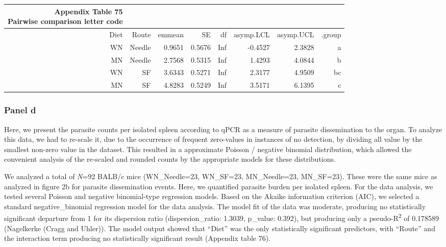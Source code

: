 \documentclass[
  12pt,
  letterpaper,
]{article}
\begin{document}
\begingroup
\fontsize{12.0pt}{14.4pt}\selectfont
\begin{longtable}{rrrrrrrr}
\caption*{
{\large \textbf{Appendix Table 75}} \\ 
{\small \textbf{Pairwise comparison letter code}}
} \\ 
\toprule
{Diet} & {Route} & {emmean} & {SE} & {df} & {asymp.LCL} & {asymp.UCL} & {.group} \\ 
\midrule\addlinespace[2.5pt]
WN & Needle & 0.9651 & 0.5676 & Inf & -0.4527 & 2.3828 &  a   \\ 
MN & Needle & 2.7568 & 0.5315 & Inf & 1.4293 & 4.0844 &   b  \\ 
WN & SF & 3.6343 & 0.5271 & Inf & 2.3177 & 4.9509 &   bc \\ 
MN & SF & 4.8283 & 0.5249 & Inf & 3.5171 & 6.1395 &    c \\ 
\bottomrule
\end{longtable}
\endgroup

\subsubsection{Panel d}\label{panel-d}

Here, we present the parasite counts per isolated spleen according to qPCR as a measure of parasite dissemination to the organ. To analyze this data, we had to re-scale it, due to the occurrence of frequent zero-values in instances of no detection, by dividing all value by the smallest non-zero value in the dataset. This resulted in a approximate Poisson / negative binomial distribution, which allowed the convenient analysis of the re-scaled and rounded counts by the appropriate models for these distributions.

We analyzed a total of \emph{N}=92 BALB/c mice (WN\_Needle=23, WN\_SF=23, MN\_Needle=23, MN\_SF=23). These were the same mice as analyzed in figure 2b for parasite dissemination events. Here, we quantified parasite burden per isolated spleen. For the data analysis, we tested several Poisson and negative binomial-type regression models. Based on the Akaike information criterion (AIC), we selected a standard negative\_binomial regression model for the data analysis. The model fit of the data was moderate, producing no statistically significant departure from 1 for its dispersion ratio (dispersion\_ratio: 1.3039, p\_value: 0.392), but producing only a pseudo-R\textsuperscript{2} of 0.178589 (Nagelkerke (Cragg and Uhler)). The model output showed that ``Diet'' was the only statistically significant predictors, with ``Route'' and the interaction term producing no statistically significant result (Appendix table 76).
\end{document}
